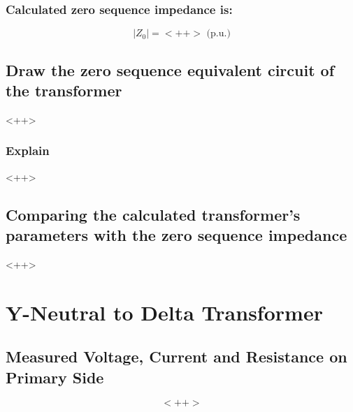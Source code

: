 \documentclass{article}
\begin{document}
\subsubsection{Calculated zero sequence impedance is:} 

\begin{equation}
  | Z_0 | = <++> \text{ (p.u.)}
\end{equation}

\subsection{Draw the zero sequence equivalent circuit of the transformer} 

<++>

\subsubsection{Explain} 

<++>

\subsection{Comparing the calculated transformer's parameters with the zero sequence impedance} 
<++>

\section{Y-Neutral to Delta Transformer} 

\subsection{Measured Voltage, Current and Resistance on Primary Side} 

\begin{equation}
  <++>
\end{equation}
\end{document}
